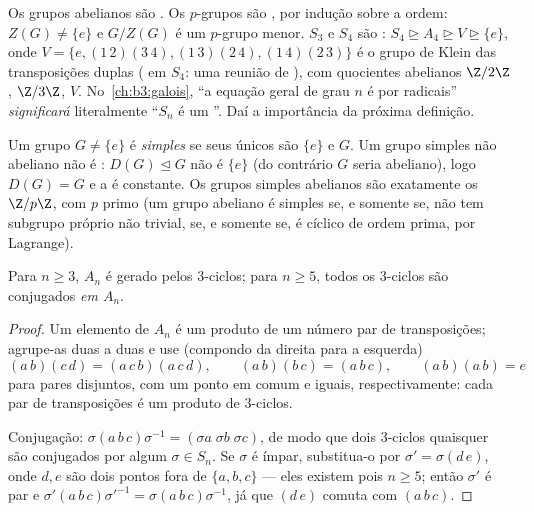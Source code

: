 \begin{example}\label{ex:b3:groups:solvableexamples}
Os grupos abelianos são . Os $p$-grupos são , por
indução sobre a ordem: $Z(G) \neq \{e\}$ e $G/Z(G)$ é um $p$-grupo menor.
$S_3$ e $S_4$ são : $S_4 \trianglerighteq A_4
\trianglerighteq V \trianglerighteq \{e\}$, onde $V = \{e,
(1\,2)(3\,4), (1\,3)(2\,4), (1\,4)(2\,3)\}$ é o grupo de
Klein das transposições duplas ( em $S_4$: uma reunião de
), com quocientes abelianos $\Z/2\Z$,
$\Z/3\Z$, $V$. No~\cref{ch:b3:galois}, ``a equação geral de grau
$n$ é  por radicais'' \emph{significará} literalmente
``$S_n$ é um ''. Daí a importância da próxima
definição.
\end{example}

\begin{definition}\label{def:b3:groups:simple}
Um grupo $G \neq \{e\}$ é \emph{simples} se seus únicos
 são $\{e\}$ e $G$. Um grupo simples não
abeliano não é : $D(G) \trianglelefteq G$ não é $\{e\}$ (do contrário $G$
seria abeliano), logo $D(G) = G$ e a  é constante. Os grupos
simples abelianos são exatamente os $\Z/p\Z$, com $p$ primo (um
grupo abeliano é simples se, e somente se, não tem subgrupo próprio não
trivial, se, e somente se, é cíclico de ordem prima, por Lagrange).
\end{definition}

\begin{lemma}\label{lem:b3:groups:threecycles}
Para $n \geq 3$, $A_n$ é gerado pelos $3$-ciclos; para $n \geq 5$, todos
os $3$-ciclos são conjugados \emph{em $A_n$}.
\end{lemma}

\begin{proof}
Um elemento de $A_n$ é um produto de um número par de
transposições; agrupe-as duas a duas e use (compondo da direita para a
esquerda)
\[
(a\,b)(c\,d) = (a\,c\,b)(a\,c\,d), \qquad
(a\,b)(b\,c) = (a\,b\,c), \qquad
(a\,b)(a\,b) = e
\]
para pares disjuntos, com um ponto em comum e iguais, respectivamente:
cada par de transposições é um produto de $3$-ciclos.

Conjugação: $\sigma(a\,b\,c)\sigma^{-1} = (\sigma a\; \sigma b\;
\sigma c)$, de modo que dois $3$-ciclos quaisquer são
conjugados por algum $\sigma \in
S_n$. Se $\sigma$ é ímpar, substitua-o por
$\sigma' = \sigma (d\,e)$, onde $d, e$ são dois pontos fora de $\{a, b, c\}$ --- eles existem
pois $n \geq 5$; então $\sigma'$ é par e $\sigma'(a\,b\,c)
\sigma'^{-1} = \sigma(a\,b\,c)\sigma^{-1}$, já que $(d\,e)$ comuta com
$(a\,b\,c)$.
\end{proof}

